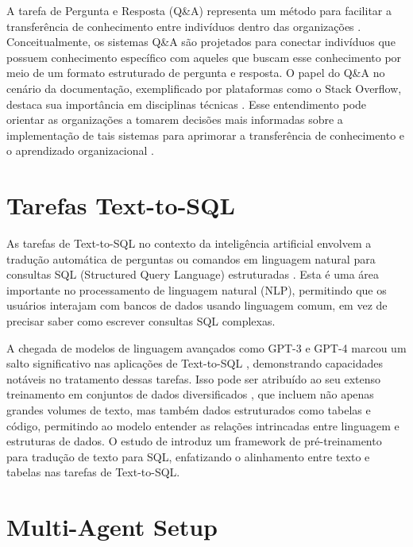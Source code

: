             A tarefa de Pergunta e Resposta (Q\&A) representa um método para facilitar a transferência de conhecimento entre indivíduos dentro das organizações \cite{Iske2005}. Conceitualmente, os sistemas Q\&A são projetados para conectar indivíduos que possuem conhecimento específico com aqueles que buscam esse conhecimento por meio de um formato estruturado de pergunta e resposta.
            O papel do Q\&A no cenário da documentação, exemplificado por plataformas como o Stack Overflow, destaca sua importância em disciplinas técnicas \cite{Treude2011}. Esse entendimento pode orientar as organizações a tomarem decisões mais informadas sobre a implementação de tais sistemas para aprimorar a transferência de conhecimento e o aprendizado organizacional \cite{Iske2005}.
    
    
        \section{Tarefas Text-to-SQL}
        
            As tarefas de Text-to-SQL no contexto da inteligência artificial envolvem a tradução automática de perguntas ou comandos em linguagem natural para consultas SQL (Structured Query Language) estruturadas \cite{Qin2022}. Esta é uma área importante no processamento de linguagem natural (NLP), permitindo que os usuários interajam com bancos de dados usando linguagem comum, em vez de precisar saber como escrever consultas SQL complexas.
            
            A chegada de modelos de linguagem avançados como GPT-3 e GPT-4 \cite{OpenAI2023} marcou um salto significativo nas aplicações de Text-to-SQL \cite{Singh2023}, demonstrando capacidades notáveis no tratamento dessas tarefas. Isso pode ser atribuído ao seu extenso treinamento em conjuntos de dados diversificados \cite{Deng2021}, que incluem não apenas grandes volumes de texto, mas também dados estruturados como tabelas e código, permitindo ao modelo entender as relações intrincadas entre linguagem e estruturas de dados. O estudo de \cite{Deng2023} introduz um framework de pré-treinamento para tradução de texto para SQL, enfatizando o alinhamento entre texto e tabelas nas tarefas de Text-to-SQL.
        
        
        \section{Multi-Agent Setup} 
    
